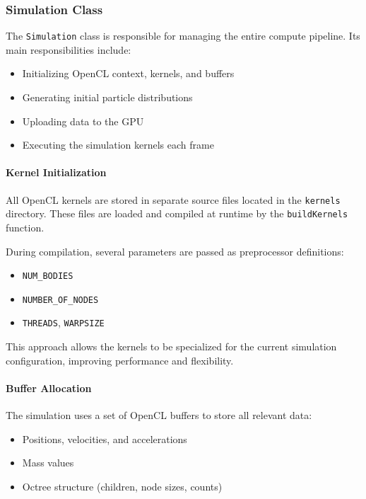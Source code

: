 \documentclass[12pt]{article}
\begin{document}
\subsubsection{Simulation Class}

The \texttt{Simulation} class is responsible for managing the entire compute pipeline.
Its main responsibilities include:

\begin{itemize}
    \item Initializing OpenCL context, kernels, and buffers
    \item Generating initial particle distributions
    \item Uploading data to the GPU
    \item Executing the simulation kernels each frame
\end{itemize}

\paragraph{Kernel Initialization}

All OpenCL kernels are stored in separate source files located in the
\texttt{kernels} directory. These files are loaded and compiled at runtime
by the \texttt{buildKernels} function.

During compilation, several parameters are passed as preprocessor definitions:

\begin{itemize}
    \item \texttt{NUM\_BODIES}
    \item \texttt{NUMBER\_OF\_NODES}
    \item \texttt{THREADS}, \texttt{WARPSIZE}
\end{itemize}

This approach allows the kernels to be specialized for the current simulation
configuration, improving performance and flexibility.

\paragraph{Buffer Allocation}

The simulation uses a set of OpenCL buffers to store all relevant data:

\begin{itemize}
    \item Positions, velocities, and accelerations
    \item Mass values
    \item Octree structure (children, node sizes, counts)
\end{itemize}
\end{document}
